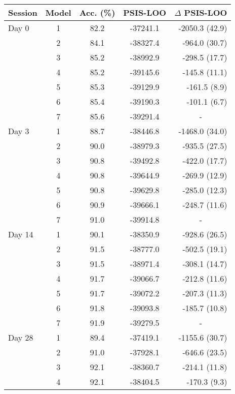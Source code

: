 \documentclass[a4paper,12pt]{article}
\begin{document}
\begin{refsection}[supp]
\begin{table}[h!]
    \centering
    \small
    \begin{tabular}{lcccr}
        \toprule
        Session & Model & Acc. (\%) & PSIS-LOO & \multicolumn{1}{c}{$\Delta$ PSIS-LOO} \\
        \midrule
         Day 0 & 1 & 82.2 & -37241.1 & -2050.3 (42.9) \\
         & 2 & 84.1 & -38327.4 & -964.0 (30.7) \\
         & 3 & 85.2 & -38992.9 & -298.5 (17.7) \\
         & 4 & 85.2 & -39145.6 & -145.8 (11.1) \\
         & 5 & 85.3 & -39129.9 & -161.5 (8.9) \\
         & 6 & 85.4 & -39190.3 & -101.1 (6.7) \\
         & 7 & 85.6 & -39291.4 & \multicolumn{1}{c}{-} \\
         \midrule
         Day 3 & 1 & 88.7 & -38446.8 & -1468.0 (34.0) \\
         & 2 & 90.0 & -38979.3 & -935.5 (27.5) \\
         & 3 & 90.8 & -39492.8 & -422.0 (17.7) \\
         & 4 & 90.8 & -39644.9 & -269.9 (12.9) \\
         & 5 & 90.8 & -39629.8 & -285.0 (12.3) \\
         & 6 & 90.9 & -39666.1 & -248.7 (11.6) \\
         & 7 & 91.0 & -39914.8 & \multicolumn{1}{c}{-} \\
         \midrule
         Day 14 & 1 & 90.1 & -38350.9 & -928.6 (26.5) \\
         & 2 & 91.5 & -38777.0 & -502.5 (19.1) \\
         & 3 & 91.5 & -38971.4 & -308.1 (14.7) \\
         & 4 & 91.7 & -39066.7 & -212.8 (11.6) \\
         & 5 & 91.7 & -39072.2 & -207.3 (11.3) \\
         & 6 & 91.8 & -39093.8 & -185.7 (10.8) \\
         & 7 & 91.9 & -39279.5 & \multicolumn{1}{c}{-} \\
         \midrule
         Day 28 & 1 & 89.4 & -37419.1 & -1155.6 (30.7) \\
         & 2 & 91.0 & -37928.1 & -646.6 (23.5) \\
         & 3 & 92.1 & -38360.7 & -214.1 (11.8) \\
         & 4 & 92.1 & -38404.5 & -170.3 (9.3) \\

\end{tabular}
\end{table}
\end{refsection}
\end{document}

